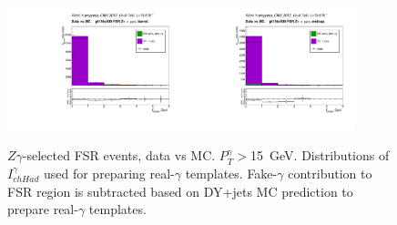 \begin{figure}[htb]
  \begin{center}
   \includegraphics[width=0.45\textwidth]{../figs/figs_v11/MUON_ZGamma/PrepareYields/c_TotalDATAvsMC_Barrel__phoPFChIsoCorrFSR_pt15to500_FSR.pdf}\includegraphics[width=0.45\textwidth]{../figs/figs_v11/MUON_ZGamma/PrepareYields/c_TotalDATAvsMC_Endcap__phoPFChIsoCorrFSR_pt15to500_FSR.pdf}\\
  \caption{$Z\gamma$-selected FSR events, data vs MC. $P_T^{\gamma}>$15~GeV. Distributions of $I_{chHad}^{\gamma}$ used for preparing real-$\gamma$ templates. Fake-$\gamma$ contribution to FSR region is subtracted based on DY+jets MC prediction to prepare real-$\gamma$ templates.}
  \label{fig:Zg_FSR_phoPFChIsoCorr}
  \end{center}
\end{figure}

